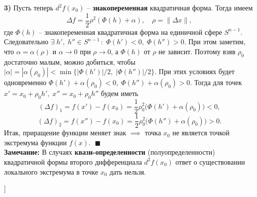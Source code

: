 \textbf{3)} Пусть теперь $d^2 f(x_0)$ -- \textbf{знакопеременная} квадратичная форма. Тогда имеем 
$$
\Delta f = \frac{1}{2} \rho^2 (\Phi(h) + \alpha),\quad \rho = \|\Delta x\|,
$$
где $\Phi(h)$ -- знакопеременная квадратичная форма на единичной сфере $S^{n-1}$. 
Следовательно $ \exists \; h', \; h'' \in S^{n-1} \,: \; \Phi(h') <0, \; \Phi(h'') > 0$. 
При этом заметим, что $\alpha = \alpha (\rho)$ и $\alpha \to 0$ при $\rho \to 0$, а $\Phi(h)$ от $\rho$ не зависит.
Поэтому взяв $\rho_0$ достаточно малым, можно добиться, чтобы $|\alpha| = |\alpha(\rho_0)| < \min \big\{|\Phi(h')| / 2, \;  |\Phi(h'')| / 2\big\}$. 
При этих условиях будет одновременно $ \Phi(h') + \alpha(\rho_0) < 0, \; \Phi(h'') + \alpha(\rho_0) > 0$. 
Тогда для точек $x' = x_0 + \rho_0 h', \; x'' = x_0 + \rho_0 h''$ будем иметь
$$
(\Delta f)_1 = f(x') - f(x_0) = \frac{1}{2} \rho_0^2 \big(\Phi(h') + \alpha(\rho_0) \big) < 0,
$$
$$
(\Delta f)_2 = f(x'') - f(x_0) = \frac{1}{2} \rho_0^2 \big(\Phi(h'') + \alpha(\rho_0) \big) > 0.
$$
Итак, приращение функции меняет знак $\implies$ точка $x_0$ не является точкой экстремума функции $f(x)$. $\;\blacksquare$\\

\textbf{Замечание:} В случаях \textbf{квази-определенности} (полуопределенности) квадратичной формы второго дифференциала $d^2 f(x_0)$ ответ о существовании локального экстремума в точке $x_0$ дать нельзя.


\bigbreak
[\cite[page 69-74]{Sadovn_func_mhogih}]
